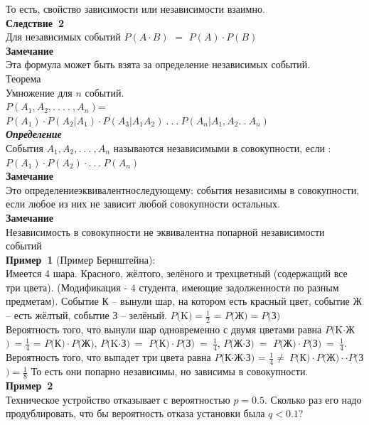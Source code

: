 \documentclass[russian, 12pt, fleqn,x11names]{article}
\begin{document}
То есть, свойство зависимости или независимости взаимно.\\
\textbf{Следствие\ 2}\\ Для независимых событий $P(A\cdot B)$ $=$ $P(A)\cdot P(B)$\\
\textbf{Замечание\ } \\ Эта формула может быть взята за определение независимых событий.\\
$\textbf{Теорема}$\\
Умножение для $n$ событий.\\ $P(A_1, A_2, .\ .\ .\ .\ , A_n)$=$P(A_1)\cdot P(A_2|A_1) \cdot P(A_3|A_1A_2) \ .\ .\ . \ P(A_n|A_1,A_2 .\ .\ A_n)$\\
\textit{\textbf{Определение}}\\События $A_1, A_2, .\ .\ .\ , A_n$ называются независимыми в совокупности, если :\\ $P(A_1)\cdot P(A_2) \cdot .\ .\ .\  P(A_n)$\\
\textbf{Замечание\ }  \\
Это \nolinebreak[4] определение\nolinebreak[4] эквивалентно\nolinebreak[4] следующему:  события независимы в совокупности, если любое из них не зависит любой совокупности остальных.\\
\textbf{Замечание\ } \\ Независимость в совокупности не эквивалентна попарной независимости событий\\
\textbf{Пример\ 1 }(Пример Бернштейна): \\Имеется 4 шара. Красного, жёлтого, зелёного и трехцветный (содержащий все три цвета). (Модификация - $4$ студента, имеющие задолженности по разным предметам). Событие К --  вынули шар, на котором есть красный цвет, событие Ж -- есть жёлтый, событие З -- зелёный. $P($K$)=\frac{1}{2}$ = $P($Ж$)=P($З$)$\\
Вероятность того, что вынули шар одновременно с двумя цветами равна $P($K$\cdot$Ж$)\ =\frac{1}{4}$ = $P($К$)\cdot P($Ж$)$,  $P($K$\cdot$З$)\ =$  $P($К$)\cdot P($З$)\  = \  \frac{1}{4}$, $P($Ж$\cdot$З$)\ =$  $P($Ж$)\cdot P($З$)\  =\ \frac{1}{4}$.\\Вероятность того, что выпадет три цвета равна $P($К$\cdot$Ж$\cdot$З$)$ = $\frac{1}{4}\neq \ P($К$)\cdot P($Ж$) \cdot \cdot  P($З$)=\frac{1}{8}$ То есть они попарно независимы, но зависимы в совокупности.\\
\textbf{Пример\ 2}\\
Техническое устройство отказывает с вероятностью $p=0.5$. Сколько раз его надо продублировать, что бы вероятность отказа установки была $q < 0.1$?\\
\end{document}

